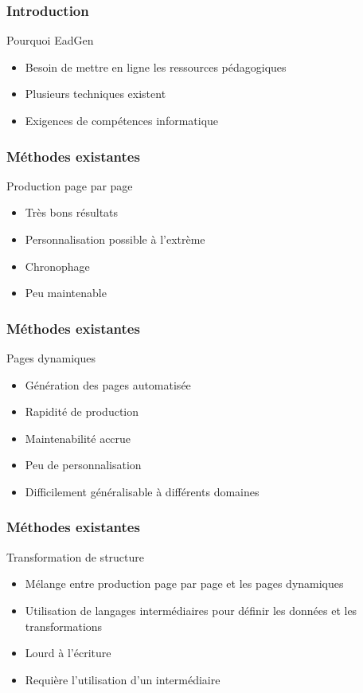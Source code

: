 \begin{frame}
	\frametitle{Introduction}
	\begin{block}{Pourquoi EadGen}
		\begin{itemize}
			\item Besoin de mettre en ligne les ressources pédagogiques 
			\item Plusieurs techniques existent
			\item Exigences de compétences informatique
		\end{itemize}
	\end{block}
\end{frame}
\begin{frame}
	\frametitle{Méthodes existantes}
	\begin{block}{Production page par page}
		\begin{itemize}
			\item Très bons résultats
			\item Personnalisation possible à l'extrème
			\item Chronophage
			\item Peu maintenable
		\end{itemize}
	\end{block}
\end{frame}
\begin{frame}
	\frametitle{Méthodes existantes}
	\begin{block}{Pages dynamiques}
		\begin{itemize}
			\item Génération des pages automatisée
			\item Rapidité de production
			\item Maintenabilité accrue
			\item Peu de personnalisation
			\item Difficilement généralisable à différents domaines
		\end{itemize}
	\end{block}
\end{frame}
\begin{frame}
	\frametitle{Méthodes existantes}
	\begin{block}{Transformation de structure}
		\begin{itemize}
			\item Mélange entre production page par page et les pages dynamiques
			\item Utilisation de langages intermédiaires pour définir les données et les transformations
			\item Lourd à l'écriture
			\item Requière l'utilisation d'un intermédiaire 
		\end{itemize}
	\end{block}
\end{frame}